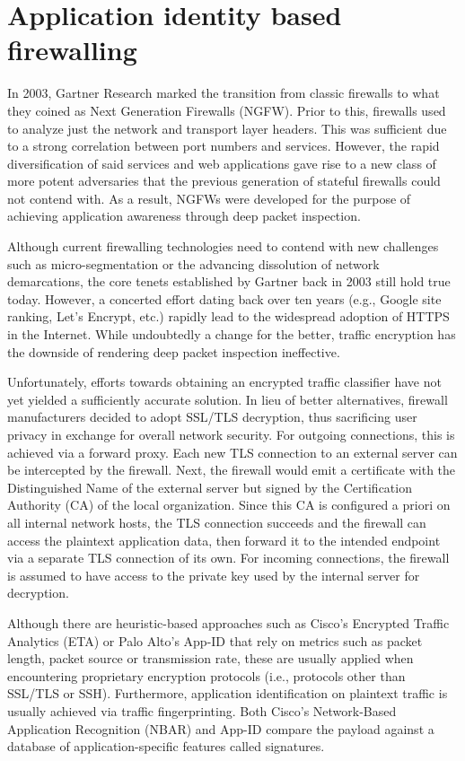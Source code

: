 \chapter{Application identity based firewalling}

In 2003, Gartner Research marked the transition from classic firewalls to what they coined as Next Generation Firewalls (NGFW). Prior to this, firewalls used to analyze just the network and transport layer headers. This was sufficient due to a strong correlation between port numbers and services. However, the rapid diversification of said services and web applications gave rise to a new class of more potent adversaries that the previous generation of stateful firewalls could not contend with. As a result, NGFWs were developed for the purpose of achieving application awareness through deep packet inspection.

Although current firewalling technologies need to contend with new challenges such as micro-segmentation or the advancing dissolution of network demarcations, the core tenets established by Gartner back in 2003 still hold true today. However, a concerted effort dating back over ten years (e.g., Google site ranking, Let's Encrypt, etc.) rapidly lead to the widespread adoption of HTTPS in the Internet. While undoubtedly a change for the better, traffic encryption has the downside of rendering deep packet inspection ineffective.

Unfortunately, efforts towards obtaining an encrypted traffic classifier have not yet yielded a sufficiently accurate solution. In lieu of better alternatives, firewall manufacturers decided to adopt SSL/TLS decryption, thus sacrificing user privacy in exchange for overall network security. For outgoing connections, this is achieved via a forward proxy. Each new TLS connection to an external server can be intercepted by the firewall. Next, the firewall would emit a certificate with the Distinguished Name of the external server but signed by the Certification Authority (CA) of the local organization. Since this CA is configured a priori on all internal network hosts, the TLS connection succeeds and the firewall can access the plaintext application data, then forward it to the intended endpoint via a separate TLS connection of its own. For incoming connections, the firewall is assumed to have access to the private key used by the internal server for decryption.

Although there are heuristic-based approaches such as Cisco's Encrypted Traffic Analytics (ETA) or Palo Alto's App-ID that rely on metrics such as packet length, packet source or transmission rate, these are usually applied when encountering proprietary encryption protocols (i.e., protocols other than SSL/TLS or SSH). Furthermore, application identification on plaintext traffic is usually achieved via traffic fingerprinting. Both Cisco's Network-Based Application Recognition (NBAR) and App-ID compare the payload against a database of application-specific features called signatures.

